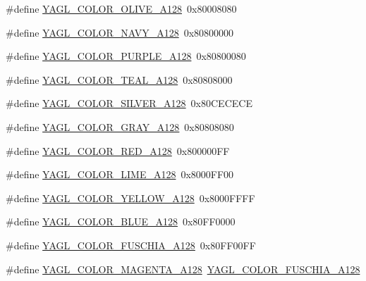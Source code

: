 \begin{DoxyCompactItemize}
\item 
\#define \hyperlink{group____consts__color_gabe297f2f354f9e7d1aacdbc286dc6ceb}{Y\-A\-G\-L\-\_\-\-C\-O\-L\-O\-R\-\_\-\-O\-L\-I\-V\-E\-\_\-\-A128}~0x80008080
\item 
\#define \hyperlink{group____consts__color_ga77244a0b4106c31e22e2bd01fa82e9b2}{Y\-A\-G\-L\-\_\-\-C\-O\-L\-O\-R\-\_\-\-N\-A\-V\-Y\-\_\-\-A128}~0x80800000
\item 
\#define \hyperlink{group____consts__color_gab7cea7ce1318c895b2a0a1e8c24e1de2}{Y\-A\-G\-L\-\_\-\-C\-O\-L\-O\-R\-\_\-\-P\-U\-R\-P\-L\-E\-\_\-\-A128}~0x80800080
\item 
\#define \hyperlink{group____consts__color_gae0bf8e494e5e3b9a4a92e082be777901}{Y\-A\-G\-L\-\_\-\-C\-O\-L\-O\-R\-\_\-\-T\-E\-A\-L\-\_\-\-A128}~0x80808000
\item 
\#define \hyperlink{group____consts__color_gadcbe00e0dc203858f097b675c1edd062}{Y\-A\-G\-L\-\_\-\-C\-O\-L\-O\-R\-\_\-\-S\-I\-L\-V\-E\-R\-\_\-\-A128}~0x80\-C\-E\-C\-E\-C\-E
\item 
\#define \hyperlink{group____consts__color_gaafaba9d911aa9bfbe7798dde7e704464}{Y\-A\-G\-L\-\_\-\-C\-O\-L\-O\-R\-\_\-\-G\-R\-A\-Y\-\_\-\-A128}~0x80808080
\item 
\#define \hyperlink{group____consts__color_gaa6fbbeed27865fe3f47707080214b7cd}{Y\-A\-G\-L\-\_\-\-C\-O\-L\-O\-R\-\_\-\-R\-E\-D\-\_\-\-A128}~0x800000\-F\-F
\item 
\#define \hyperlink{group____consts__color_ga0180d8331de5382036398accd1c8d856}{Y\-A\-G\-L\-\_\-\-C\-O\-L\-O\-R\-\_\-\-L\-I\-M\-E\-\_\-\-A128}~0x8000\-F\-F00
\item 
\#define \hyperlink{group____consts__color_gaabcba25785c160483e1f1a253a36e1d4}{Y\-A\-G\-L\-\_\-\-C\-O\-L\-O\-R\-\_\-\-Y\-E\-L\-L\-O\-W\-\_\-\-A128}~0x8000\-F\-F\-F\-F
\item 
\#define \hyperlink{group____consts__color_ga43dce16cde92d5f2d1c1ff594ce7598a}{Y\-A\-G\-L\-\_\-\-C\-O\-L\-O\-R\-\_\-\-B\-L\-U\-E\-\_\-\-A128}~0x80\-F\-F0000
\item 
\#define \hyperlink{group____consts__color_gadf3632b14122a2eb8917d82463e992e1}{Y\-A\-G\-L\-\_\-\-C\-O\-L\-O\-R\-\_\-\-F\-U\-S\-C\-H\-I\-A\-\_\-\-A128}~0x80\-F\-F00\-F\-F
\item 
\#define \hyperlink{group____consts__color_ga73ca8b6b5f06497980fa02130c035214}{Y\-A\-G\-L\-\_\-\-C\-O\-L\-O\-R\-\_\-\-M\-A\-G\-E\-N\-T\-A\-\_\-\-A128}~\hyperlink{group____consts__color_gadf3632b14122a2eb8917d82463e992e1}{Y\-A\-G\-L\-\_\-\-C\-O\-L\-O\-R\-\_\-\-F\-U\-S\-C\-H\-I\-A\-\_\-\-A128}

\end{DoxyCompactItemize}
